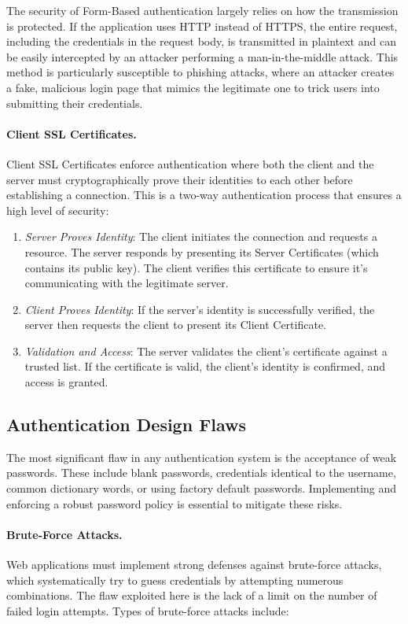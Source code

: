 The security of Form-Based authentication largely relies on how the transmission is protected. If the application uses HTTP instead of HTTPS, the entire request, including the credentials in the request body, is transmitted in plaintext and can be easily intercepted by an attacker performing a man-in-the-middle attack. This method is particularly susceptible to phishing attacks, where an attacker creates a fake, malicious login page that mimics the legitimate one to trick users into submitting their credentials.

\paragraph{Client SSL Certificates.} Client SSL Certificates enforce authentication where both the client and the server must cryptographically prove their identities to each other before establishing a connection. This is a two-way authentication process that ensures a high level of security:

\begin{enumerate}
    \item \textit{Server Proves Identity}: The client initiates the connection and requests a resource. The server responds by presenting its Server Certificates (which contains its public key). The client verifies this certificate to ensure it's communicating with the legitimate server.
    \item \textit{Client Proves Identity}: If the server's identity is successfully verified, the server then requests the client to present its Client Certificate.
    \item \textit{Validation and Access}: The server validates the client's certificate against a trusted list. If the certificate is valid, the client's identity is confirmed, and access is granted.
\end{enumerate}

\subsection{Authentication Design Flaws}
The most significant flaw in any authentication system is the acceptance of weak passwords. These include blank passwords, credentials identical to the username, common dictionary words, or using factory default passwords. Implementing and enforcing a robust password policy is essential to mitigate these risks.

\paragraph{Brute-Force Attacks.} Web applications must implement strong defenses against brute-force attacks, which systematically try to guess credentials by attempting numerous combinations. The flaw exploited here is the lack of a limit on the number of failed login attempts. Types of brute-force attacks include:

